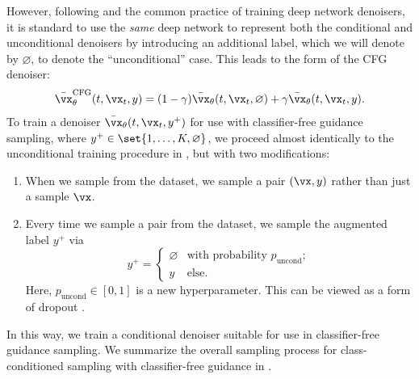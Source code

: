 \documentclass[../../book-main.tex]{subfiles}
\begin{document}
However, following \textcite{Ho2022-ry} and the common practice of
training deep network
denoisers, it is standard to use the \textit{same} deep network to represent
both the conditional and unconditional denoisers by introducing an additional
label, which we will denote by $\varnothing$, to denote the ``unconditional''
case.
This leads to the form of the CFG denoiser:
\begin{equation}\label{eq:conditional-denoising-mmse-denoiser-paired-data-approx-cfg}
    \bar{\vx}_{\theta}^{\mathrm{CFG}}(t, \vx_t, y)
    =
    (1 - \gamma) \bar{\vx}_{\theta}(t, \vx_t, \varnothing)
    +
    \gamma \bar{\vx}_{\theta}(t, \vx_t, y).
\end{equation}
To train a denoiser $\bar{\vx}_{\theta}(t, \vx_t, y^+)$ for use with
classifier-free guidance sampling, where $y^+ \in
\set{1, \dots, K, \varnothing}$, we proceed almost identically to the
unconditional training procedure in , but with two
modifications:
\begin{enumerate}
    \item When we sample from the dataset, we sample a pair $(\vx,
        y)$ rather than
        just a sample $\vx$.
    \item Every time we sample a pair from the dataset, we sample the augmented
        label $y^+$ via
        \begin{equation}
            y^+ =
            \begin{cases}
                \varnothing & \text{with probability } p_{\mathrm{uncond}}; \\
                y & \text{else}.
            \end{cases}
        \end{equation}
        Here, $p_{\mathrm{uncond}} \in [0, 1]$ is a new hyperparameter.
        This can be viewed as a form of dropout \cite{srivastava2014dropout}.
\end{enumerate}
In this way, we train a conditional denoiser suitable for use in classifier-free
guidance sampling. We summarize the overall sampling process for
class-conditioned sampling with classifier-free guidance in
.
\end{document}

